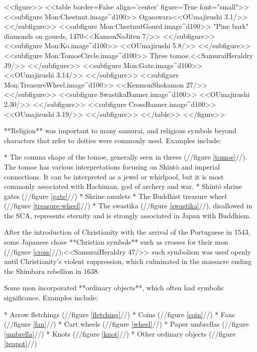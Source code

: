   <<figure>>
  <<table border=False align='center' figure=True font="small">>
  <<subfigure Mon:Chestnut.image^d100>>
    \label{chestnut}Ogasawara<<OUmajirushi 3.1/>>
  <</subfigure>>
  <<subfigure Mon:ChestnutGourd.image^d100>>
    \label{bark} "Pine bark" diamonds on gourds, 1470<<KamonNoJiten 7/>>
  <</subfigure>>
  <<subfigure Mon:Ko.image^d100>>
    \label{ko}<<OUmajirushi 5.8/>>
  <</subfigure>>
  <<subfigure Mon:TomoeCircle.image^d100>>
    \label{tomoe}Three tomoe.<<SamuraiHeraldry J9/>>
  <</subfigure>>
  <<subfigure Mon:Gate.image^d100>>
    \label{gate}<<OUmajirushi 3.14/>>
  <</subfigure>>
  <<subfigure Mon:TreasureWheel.image^d100>>
    \label{treasure-wheel}<<KenmonShokamon 27/>>
  <</subfigure>>
  <<subfigure SwastikaBanner.image^d100>>
    \label{swastika}<<OUmajirushi 2.30/>>
  <</subfigure>>
  <<subfigure CrossBanner.image^d100>>
    \label{cross}<<OUmajirushi 3.19/>>
  <</subfigure>>
  <</table>>
  <</figure>>
  
  **Religion** was important to many samurai, and religious symbols
  beyond characters that refer to deities were commonly used.  Examples
  include:
  
  * The comma shape of the tomoe, generally seen in threes (//figure
  \ref{tomoe}//).  The tomoe has various
  interpretations focusing on Shintō and imperial connections.  It can
  be interpreted as a jewel or whirlpool, but it is most commonly
  associated with Hachiman, god of archery and war.
  * Shint\=o shrine gates (//figure \ref{gate}//)
  * Shrine amulets
  * The Buddhist treasure wheel (//figure \ref{treasure-wheel}//)
  * The swastika (//figure \ref{swastika}//), 
  disallowed in the SCA, represents eternity and is strongly
  associated in Japan with Buddhism.

  After the introduction of Christianity with the arrival of the
  Portuguese in 1543, some Japanese chose **Christian symbols** such
  as crosses for their mon (//figure \ref{cross}//);<<SamuraiHeraldry
  47/>> such symbolism was used openly until Christianity's violent
  suppression, which culminated in the massacre ending the Shimbara
  rebellion in 1638.

  Some mon incorporated **ordinary objects**, which often had symbolic
  significance.  Examples include:

  * Arrow fletchings (//figure \ref{fletching}//)
  * Coins (//figure \ref{coin}//)
  * Fans (//figure \ref{fan}//)
  * Cart wheels (//figure \ref{wheel}//)
  * Paper umbrellas (//figure \ref{umbrella}//)
  * Knots (//figure \ref{knot}//)
  * Other ordinary objects (//figure \ref{teapot}//)

